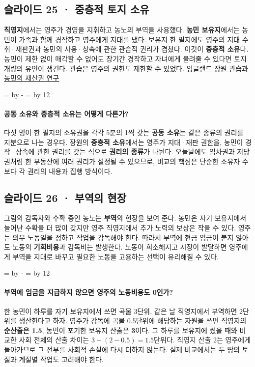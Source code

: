 \documentclass[10pt,a4paper]{article}
\newcommand{\ReserveQuestionSpace}{%
  \par\begingroup
  \dimen0=\pagegoal \advance\dimen0 by -\pagetotal
  \dimen2=\baselineskip \multiply\dimen2 by 12
  \ifdim\dimen0<\dimen2 \newpage\fi
  \endgroup}
\begin{document}
\subsection{슬라이드 25 · 중층적 토지 소유}
\textbf{직영지}에서는 영주가 경영을 지휘하고 농노의 부역을 사용했다. \textbf{농민 보유지}에서는 농민이 가족과 함께 경작하고 영주에게 지대를 냈다. 보유지 한 필지에도 영주의 지대 수취·재판권과 농민의 사용·상속에 관한 관습적 권리가 겹쳤다. 이것이 \textbf{중층적 소유}다. 농민이 제한 없이 매각할 수 없어도 장기간 경작하고 자녀에게 물려줄 수 있다면 토지 개량의 유인이 생긴다. 관습은 영주의 권한도 제한할 수 있었다. \href{https://www.cambridge.org/core/journals/journal-of-british-studies/article/waifs-and-strays-property-rights-in-late-medieval-england/148ADDD32647806A4793D0AB2933F888}{잉글랜드 장원 관습과 농민의 재산권 연구}\par

\ReserveQuestionSpace
\paragraph{공동 소유와 중층적 소유는 어떻게 다른가?}
다섯 명이 한 필지의 소유권을 각각 5분의 1씩 갖는 \textbf{공동 소유}는 같은 종류의 권리를 지분으로 나눈 경우다. 장원의 \textbf{중층적 소유}에서는 영주가 지대·재판 권한을, 농민이 경작·상속에 관한 권리를 갖는 식으로 \textbf{권리의 종류}가 나뉜다. 오늘날에도 임차권과 저당권처럼 한 부동산에 여러 권리가 설정될 수 있으므로, 비교의 핵심은 단순한 소유자 수보다 각 권리의 내용과 집행 방식이다.\par

\subsection{슬라이드 26 · 부역의 현장}
그림의 감독자와 수확 중인 농노는 \textbf{부역}의 현장을 보여 준다. 농민은 자기 보유지에서 늘어난 수확을 더 많이 갖지만 영주 직영지에서 추가 노력의 보상은 작을 수 있다. 영주는 의무 노동일을 정하고 작업을 감독해야 한다. 따라서 부역에 현금 임금이 붙지 않아도 노동의 \textbf{기회비용}과 감독비는 발생한다. 노동이 희소해지고 시장이 발달하면 영주에게 부역을 지대로 바꾸고 필요한 노동을 고용하는 선택이 유리해질 수 있다.\par

\ReserveQuestionSpace
\paragraph{부역에 임금을 지급하지 않으면 영주의 노동비용도 0인가?}
한 농민이 하루를 자기 보유지에서 쓰면 곡물 3단위, 같은 날 직영지에서 부역하면 2단위를 생산한다고 하자. 영주가 감독에 곡물 0.5단위에 해당하는 자원을 쓰면 직영지의 \textbf{순산출은 1.5}, 농민이 포기한 보유지 산출은 \textbf{3}이다. 그 하루를 보유지에 썼을 때와 비교한 사회 전체의 산출 차이는 $3-(2-0.5)=1.5$단위다. 직영지 산출 2는 영주에게 돌아가므로 그 전부를 사회적 손실에 다시 더하지 않는다. 실제 비교에서는 두 땅의 토질과 계절별 작업도 고려해야 한다.\par
\end{document}
